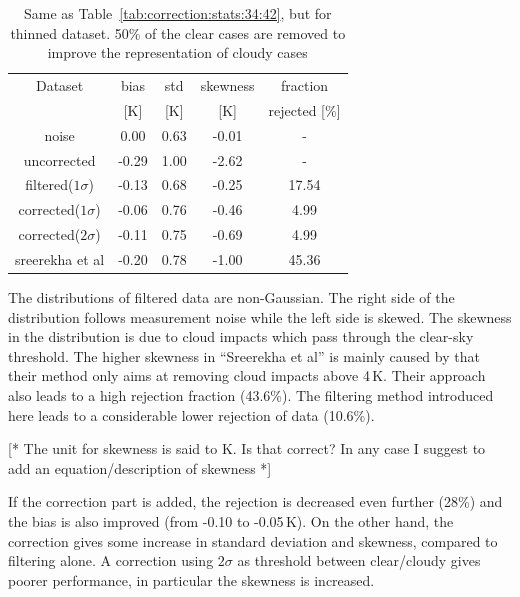 \documentclass[12pt]{article}
\begin{document}
\begin{table}[!bt]
	\centering
	\begin{tabular}[b]{c|c|c|c|c}
		Dataset  		  &   bias &   std &   skewness  & fraction  \\
		&   [K]  &   [K] & [K] & rejected [\%]\\
		\hline
	noise             		&   0.00 &  0.63 &              -0.01 &                - \\
	uncorrected       		&  -0.29 &  1.00 &              -2.62 &                - \\
	filtered($1\sigma$)  	&  -0.13 &  0.68 &              -0.25 &               17.54 \\
	corrected($1\sigma$) 	&  -0.06 &  0.76 &              -0.46 &                4.99 \\
	corrected($2\sigma$) 	&  -0.11 &  0.75 &              -0.69 &                4.99 \\
	sreerekha et al   		&  -0.20 &  0.78 &              -1.00 &               45.36 \\	
		\hline
\end{tabular}
\caption{Same as Table~\ref{tab:correction:stats:34:42}, but for thinned dataset. 50\% of the clear cases are removed to improve the representation of cloudy cases }
\label{tab:correction:stats:34:42:thinned}
\end{table}

The distributions of filtered data are non-Gaussian. The right side of the
distribution follows measurement noise while the left side is skewed. The
skewness in the distribution is due to cloud impacts which pass through the
clear-sky threshold. The higher skewness in ``Sreerekha et al'' is mainly
caused by that their method only aims at removing cloud impacts above 4\,K.
Their approach also leads to a high rejection fraction (43.6\%). The filtering
method introduced here leads to a considerable lower rejection of data
(10.6\%).

[* The unit for skewness is said to K. Is that correct? In any case I suggest
to add an equation/description of skewness *]

If the correction part is added, the rejection is decreased even further (28\%)
and the bias is also improved (from -0.10 to -0.05\,K). On the other hand, the
correction gives some increase in standard deviation and skewness, compared to
filtering alone. A correction using $2\sigma$ as threshold between clear/cloudy
gives poorer performance, in particular the skewness is increased.
\end{document}
